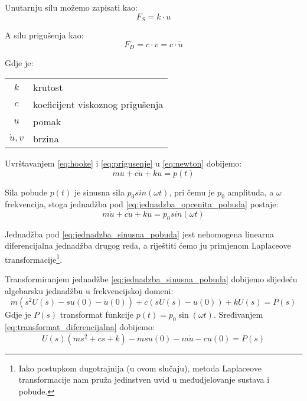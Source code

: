 Unutarnju silu možemo zapisati kao:
\begin{equation}
	F_S = k \cdot u \label{eq:hooke}
\end{equation}

A silu prigušenja kao:
\begin{equation}
	F_D = c \cdot v = c \cdot \dot{u} \label{eq:prigusenje}
\end{equation}

Gdje je:\\
\begin{table}[H]
\begin{tabular}{c l}
	$k$ & krutost \\
	$c$ & koeficijent viskoznog prigušenja \\
	$u$ & pomak \\
	$\dot{u},v$ & brzina \\
\end{tabular}
\end{table}

Uvrštavanjem \eqref{eq:hooke} i \eqref{eq:prigusenje} u \eqref{eq:newton} dobijemo:
\begin{equation}
	m\ddot{u} + c\dot{u} + ku = p(t) \label{eq:jednadzba_opcenita_pobuda}
\end{equation}

Sila pobude $p(t)$ je sinusna sila $p_0sin(\omega t)$, pri čemu je $p_0$ amplituda, a
$\omega$ frekvencija, stoga jednadžba pod \eqref{eq:jednadzba_opcenita_pobuda}
postaje:
\begin{equation}
	m\ddot{u} + c\dot{u} + ku = p_0sin(\omega t)
\label{eq:jednadzba_sinusna_pobuda}
\end{equation} 


Jednadžba pod \eqref{eq:jednadzba_sinusna_pobuda} jest nehomogena linearna
diferencijalna jednadžba drugog reda, a riještiti ćemo ju primjenom Laplaceove
transformacije\footnote{Iako postupkom dugotrajnija (u ovom
slučaju), metoda Laplaceove transformacije nam pruža jedinstven uvid u međudjelovanje sustava
i pobude.}.
\par

Transformiranjem jednadžbe \eqref{eq:jednadzba_sinusna_pobuda} dobijemo 
slijedeću algebarsku jednadžbu u frekvencijskoj domeni:
\begin{equation}\label{eq:transformat_diferencijalna}
        m(s^2U(s)-su(0)-\dot{u}(0))+
	c(sU(s)-u(0))+
	kU(s) = 
        P(s)
\end{equation}
Gdje je $P(s)$ transformat funkcije $p(t)=p_0\sin(\omega t)$.
Sređivanjem \eqref{eq:transformat_diferencijalna} dobijemo: 
\begin{equation}\label{eq:transformat_diferencijalna_sredjeno}
    U(s)\left(ms^2+cs+k\right)-msu(0)-m\dot{u}-cu(0) = P(s)
\end{equation}

